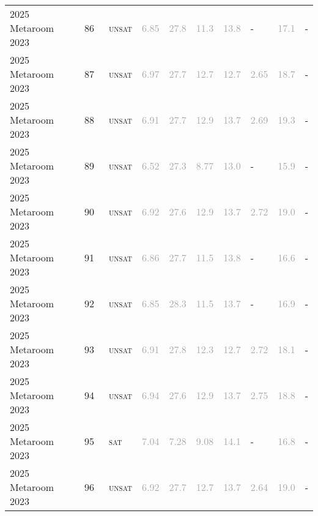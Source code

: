 \begin{center}
{\begin{longtable}{@{}llllllllll@{}}
2025 Metaroom 2023 & 86 & ~\textsc{unsat} & \textcolor{darkgray}{6.85} & \textcolor{darkgray}{27.8} & \textcolor{darkgray}{11.3} & \textcolor{darkgray}{13.8} & - & \textcolor{darkgray}{17.1} & - \\
2025 Metaroom 2023 & 87 & ~\textsc{unsat} & \textcolor{darkgray}{6.97} & \textcolor{darkgray}{27.7} & \textcolor{darkgray}{12.7} & \textcolor{darkgray}{12.7} & \textcolor{darkgray}{2.65} & \textcolor{darkgray}{18.7} & - \\
2025 Metaroom 2023 & 88 & ~\textsc{unsat} & \textcolor{darkgray}{6.91} & \textcolor{darkgray}{27.7} & \textcolor{darkgray}{12.9} & \textcolor{darkgray}{13.7} & \textcolor{darkgray}{2.69} & \textcolor{darkgray}{19.3} & - \\
2025 Metaroom 2023 & 89 & ~\textsc{unsat} & \textcolor{darkgray}{6.52} & \textcolor{darkgray}{27.3} & \textcolor{darkgray}{8.77} & \textcolor{darkgray}{13.0} & - & \textcolor{darkgray}{15.9} & - \\
2025 Metaroom 2023 & 90 & ~\textsc{unsat} & \textcolor{darkgray}{6.92} & \textcolor{darkgray}{27.6} & \textcolor{darkgray}{12.9} & \textcolor{darkgray}{13.7} & \textcolor{darkgray}{2.72} & \textcolor{darkgray}{19.0} & - \\
2025 Metaroom 2023 & 91 & ~\textsc{unsat} & \textcolor{darkgray}{6.86} & \textcolor{darkgray}{27.7} & \textcolor{darkgray}{11.5} & \textcolor{darkgray}{13.8} & - & \textcolor{darkgray}{16.6} & - \\
2025 Metaroom 2023 & 92 & ~\textsc{unsat} & \textcolor{darkgray}{6.85} & \textcolor{darkgray}{28.3} & \textcolor{darkgray}{11.5} & \textcolor{darkgray}{13.7} & - & \textcolor{darkgray}{16.9} & - \\
2025 Metaroom 2023 & 93 & ~\textsc{unsat} & \textcolor{darkgray}{6.91} & \textcolor{darkgray}{27.8} & \textcolor{darkgray}{12.3} & \textcolor{darkgray}{12.7} & \textcolor{darkgray}{2.72} & \textcolor{darkgray}{18.1} & - \\
2025 Metaroom 2023 & 94 & ~\textsc{unsat} & \textcolor{darkgray}{6.94} & \textcolor{darkgray}{27.6} & \textcolor{darkgray}{12.9} & \textcolor{darkgray}{13.7} & \textcolor{darkgray}{2.75} & \textcolor{darkgray}{18.8} & - \\
2025 Metaroom 2023 & 95 & ~\textsc{sat} & \textcolor{darkgray}{7.04} & \textcolor{darkgray}{7.28} & \textcolor{darkgray}{9.08} & \textcolor{darkgray}{14.1} & - & \textcolor{darkgray}{16.8} & - \\
2025 Metaroom 2023 & 96 & ~\textsc{unsat} & \textcolor{darkgray}{6.92} & \textcolor{darkgray}{27.7} & \textcolor{darkgray}{12.7} & \textcolor{darkgray}{13.7} & \textcolor{darkgray}{2.64} & \textcolor{darkgray}{19.0} & - \\

\end{longtable}}
\end{center}
